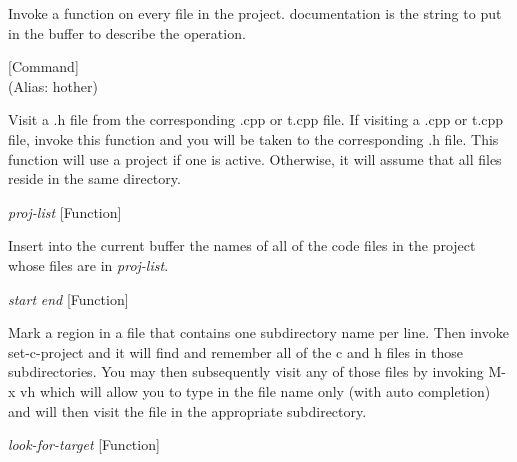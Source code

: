 \begin{doc-string}
Invoke a function on every file in the project.
documentation is the string to put in the buffer to describe the operation.
\end{doc-string}

\vspace{1em}
\noindent
{}
\usebox{\funcname}
 \hfill [Command]\\%
 (Alias: hother)

\begin{doc-string}
Visit a .h file from the corresponding .cpp or t.cpp file.  If visiting a
.cpp or t.cpp file, invoke this function and you will be taken to the
corresponding .h file.  This function will use a project if one is active.
Otherwise, it will assume that all files reside in the same directory.
\end{doc-string}

\vspace{1em}
\noindent
{}
\usebox{\funcname}\emph{proj-list}
 \hfill [Function]

\begin{doc-string}
Insert into the current buffer the names of all of the code files in the
project whose files are in \emph{proj-list}.
\end{doc-string}

\vspace{1em}
\noindent
{}
\usebox{\funcname}\emph{start} \emph{end}
 \hfill [Function]

\begin{doc-string}
Mark a region in a file that contains one subdirectory name per line.
Then invoke set-c-project and it will find and remember all of the c and h
files in those subdirectories.  You may then subsequently visit any of
those files by invoking M-x vh which will allow you to type in the file
name only (with auto completion) and will then visit the file in the
appropriate subdirectory.
\end{doc-string}

\vspace{1em}
\noindent
{}
\usebox{\funcname}\emph{look-for-target}
 \hfill [Function]

